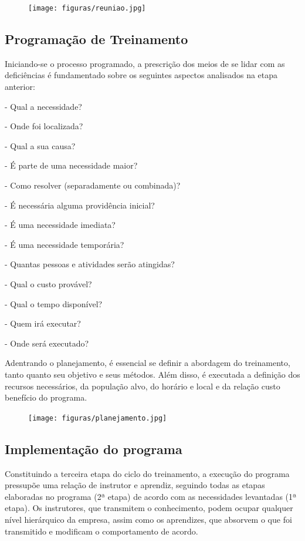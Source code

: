 \documentclass[12pt]{article}
\begin{document}
\begin{figure}[h]

\centering
\texttt{[image: figuras/reuniao.jpg]}
\end{figure}

\subsection{Programação de Treinamento}
Iniciando-se o processo programado, a prescrição dos meios de se lidar com as deficiências é fundamentado sobre os seguintes aspectos analisados na etapa anterior: 

- Qual a necessidade?

- Onde foi localizada?

- Qual a sua causa?

- É parte de uma necessidade maior?

- Como resolver (separadamente ou combinada)?

- É necessária alguma providência inicial?

- É uma necessidade imediata?

- É uma necessidade temporária?

- Quantas pessoas e atividades serão atingidas?

- Qual o custo provável?

- Qual o tempo disponível?

- Quem irá executar?

- Onde será executado?

Adentrando o planejamento, é essencial se definir a abordagem do treinamento, tanto quanto seu objetivo e seus métodos. Além disso, é executada a definição dos recursos necessários, da população alvo, do horário e local e da relação custo benefício do programa.


\begin{figure}[h]

\centering
\texttt{[image: figuras/planejamento.jpg]}
\end{figure}


\subsection{Implementação do programa}
Constituindo a terceira etapa do ciclo do treinamento, a execução do programa pressupõe uma relação de instrutor e aprendiz, seguindo todas as etapas elaboradas no programa (2ª etapa) de acordo com as necessidades levantadas (1ª etapa). Os instrutores, que transmitem o conhecimento, podem ocupar qualquer nível hierárquico da empresa, assim como os aprendizes, que absorvem o que foi transmitido e modificam o comportamento de acordo.
\end{document}
